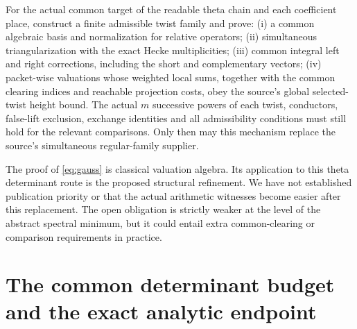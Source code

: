 \documentclass[11pt,a4paper]{article}
\begin{document}
\begin{obligation}\label{obl:packets}
For the actual common target of the readable theta chain and each coefficient place, construct a finite admissible twist family and prove: (i) a common algebraic basis and normalization for relative operators; (ii) simultaneous triangularization with the exact Hecke multiplicities; (iii) common integral left and right corrections, including the short and complementary vectors; (iv) packet-wise valuations whose weighted local sums, together with the common clearing indices and reachable projection costs, obey the source's global selected-twist height bound. The actual $m$ successive powers of each twist, conductors, false-lift exclusion, exchange identities and all admissibility conditions must still hold for the relevant comparisons. Only then may this mechanism replace the source's simultaneous regular-family supplier.
\end{obligation}
The proof of \eqref{eq:gauss} is classical valuation algebra. Its application to this theta determinant route is the proposed structural refinement. We have not established publication priority or that the actual arithmetic witnesses become easier after this replacement. The open obligation is strictly weaker at the level of the abstract spectral minimum, but it could entail extra common-clearing or comparison requirements in practice.
\section{The common determinant budget and the exact analytic endpoint}\label{sec:end}
\end{document}

